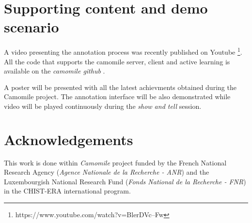 \documentclass[a4paper]{article}
\begin{document}






        \vspace{-0.3cm}
  \section{Supporting content and demo scenario}
          \vspace{-0.1cm}

A video presenting the annotation process was recently published on Youtube \footnote{https://www.youtube.com/watch?v=BlerDVc--Fw}. All the code that supports the camomile server, client and active learning is available on the \textit{camomile github} \cite{urlgithub}.



A poster will be presented with all the latest achievments obtained during the Camomile project. The annotation interface will be also demonstrated while video will be played continuously during the \textit{show and tell} session. %

        \vspace{-0.3cm}
 \section{Acknowledgements}
  
This work is done within \textit{Camomile} project funded by the French National Research Agency (\textit{Agence Nationale de la Recherche - ANR}) and the Luxembourgish National Research Fund (\textit{Fonds National de la Recherche - FNR}) in the CHIST-ERA international program.

  
  \eightpt
  
  
  
\end{document}

